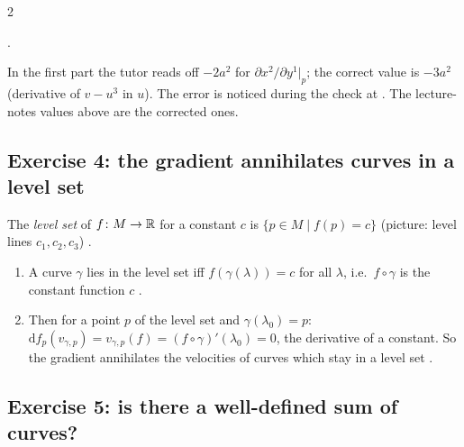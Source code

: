 \begin{paracol}{2}
\begin{enumerate}
        .
\end{enumerate}
\begin{coursenote}
In the first part the tutor reads off $-2a^2$ for $\partial x^2/\partial y^1|_p$; the correct value is $-3a^2$ (derivative of $v-u^3$ in $u$). The error is noticed during the check at . The lecture-notes values above are the corrected ones.
\end{coursenote}

\subsection*{Exercise 4: the gradient annihilates curves in a level set}

The \emph{level set} of $f\colon M\to\mathbb{R}$ for a constant $c$ is $\{p\in M\mid f(p)=c\}$ (picture: level lines $c_1,c_2,c_3$) .
\begin{enumerate}
  \item A curve $\gamma$ lies in the level set iff $f(\gamma(\lambda))=c$ for all $\lambda$, i.e.\ $f\circ\gamma$ is the constant function $c$ .
  \item Then for a point $p$ of the level set and $\gamma(\lambda_0)=p$: $\mathrm df_p(v_{\gamma,p})=v_{\gamma,p}(f)=(f\circ\gamma)'(\lambda_0)=0$, the derivative of a constant. So the gradient annihilates the velocities of curves which stay in a level set
        .
\end{enumerate}

\subsection*{Exercise 5: is there a well-defined sum of curves?}


\end{paracol}

